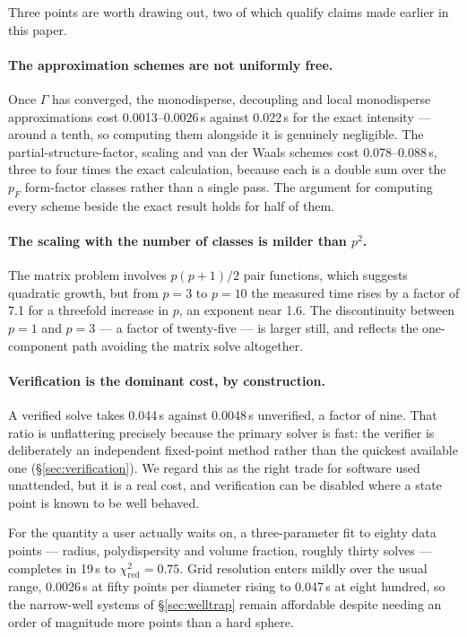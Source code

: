 \documentclass[11pt,a4paper]{article}
\begin{document}
Three points are worth drawing out, two of which qualify claims made earlier
in this paper.

\paragraph{The approximation schemes are not uniformly free.}
Once $\Gamma$ has converged, the monodisperse, decoupling and local
monodisperse approximations cost 0.0013--0.0026\,s against 0.022\,s for the
exact intensity --- around a tenth, so computing them alongside it is
genuinely negligible. The partial-structure-factor, scaling and van der Waals
schemes cost 0.078--0.088\,s, three to four times the exact calculation,
because each is a double sum over the $p_F$ form-factor classes rather than a
single pass. The argument for computing every scheme beside the exact result
holds for half of them.

\paragraph{The scaling with the number of classes is milder than $p^2$.}
The matrix problem involves $p(p+1)/2$ pair functions, which suggests
quadratic growth, but from $p = 3$ to $p = 10$ the measured time rises by a
factor of 7.1 for a threefold increase in $p$, an exponent near 1.6. The
discontinuity between $p = 1$ and $p = 3$ --- a factor of twenty-five --- is
larger still, and reflects the one-component path avoiding the matrix solve
altogether.

\paragraph{Verification is the dominant cost, by construction.}
A verified solve takes 0.044\,s against 0.0048\,s unverified, a factor of
nine. That ratio is unflattering precisely because the primary solver is
fast: the verifier is deliberately an independent fixed-point method rather
than the quickest available one (\S\ref{sec:verification}). We regard this as
the right trade for software used unattended, but it is a real cost, and
verification can be disabled where a state point is known to be well behaved.

For the quantity a user actually waits on, a three-parameter fit to eighty
data points --- radius, polydispersity and volume fraction, roughly thirty
solves --- completes in 19\,s to $\chi^2_{\mathrm{red}} = 0.75$. Grid
resolution enters mildly over the usual range, 0.0026\,s at fifty points per
diameter rising to 0.047\,s at eight hundred, so the narrow-well systems of
\S\ref{sec:welltrap} remain affordable despite needing an order of magnitude
more points than a hard sphere.
\end{document}
